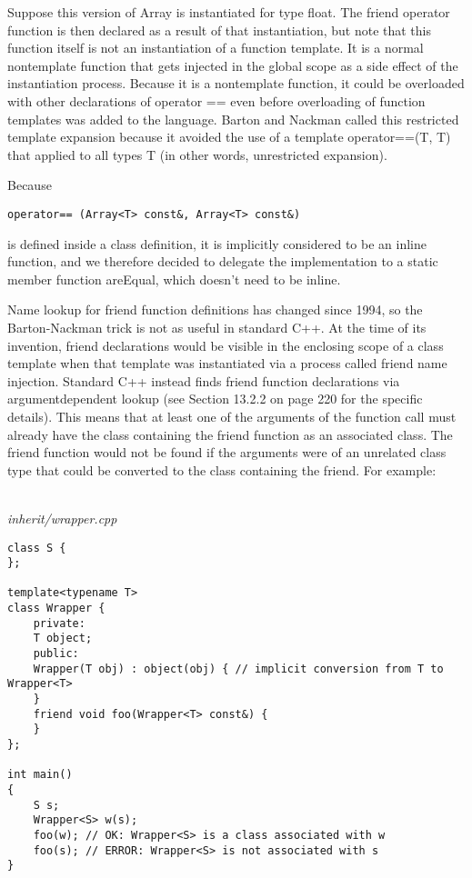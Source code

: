 Suppose this version of Array is instantiated for type float. The friend operator function is then declared as a result of that instantiation, but note that this function itself is not an instantiation of a function template. It is a normal nontemplate function that gets injected in the global scope as a side effect of the instantiation process. Because it is a nontemplate function, it could be overloaded with other declarations of operator == even before overloading of function templates was added to the language. Barton and Nackman called this restricted template expansion because it avoided the use of a template operator==(T, T) that applied to all types T (in other words, unrestricted expansion).

Because

\begin{lstlisting}[style=styleCXX]
operator== (Array<T> const&, Array<T> const&)
\end{lstlisting}

is defined inside a class definition, it is implicitly considered to be an inline function, and we therefore decided to delegate the implementation to a static member function areEqual, which doesn’t need to be inline.

Name lookup for friend function definitions has changed since 1994, so the Barton-Nackman trick is not as useful in standard C++. At the time of its invention, friend declarations would be visible in the enclosing scope of a class template when that template was instantiated via a process called friend name injection. Standard C++ instead finds friend function declarations via argumentdependent lookup (see Section 13.2.2 on page 220 for the specific details). This means that at least one of the arguments of the function call must already have the class containing the friend function as an associated class. The friend function would not be found if the arguments were of an unrelated class type that could be converted to the class containing the friend. For example:

\hspace*{\fill} \\ %
\noindent
\textit{inherit/wrapper.cpp}
\begin{lstlisting}[style=styleCXX]
class S {
};

template<typename T>
class Wrapper {
	private:
	T object;
	public:
	Wrapper(T obj) : object(obj) { // implicit conversion from T to Wrapper<T>
	}
	friend void foo(Wrapper<T> const&) {
	}
};

int main()
{
	S s;
	Wrapper<S> w(s);
	foo(w); // OK: Wrapper<S> is a class associated with w
	foo(s); // ERROR: Wrapper<S> is not associated with s
}
\end{lstlisting}

